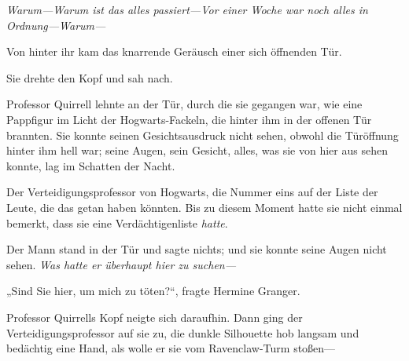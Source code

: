 


\emph{Warum—Warum ist das alles passiert—Vor einer Woche war noch alles in Ordnung—Warum—}

Von hinter ihr kam das knarrende Geräusch einer sich öffnenden Tür.

Sie drehte den Kopf und sah nach.

Professor Quirrell lehnte an der Tür, durch die sie gegangen war, wie eine Pappfigur im Licht der Hogwarts-Fackeln, die hinter ihm in der offenen Tür brannten. Sie konnte seinen Gesichtsausdruck nicht sehen, obwohl die Türöffnung hinter ihm hell war; seine Augen, sein Gesicht, alles, was sie von hier aus sehen konnte, lag im Schatten der Nacht.

Der Verteidigungsprofessor von Hogwarts, die Nummer eins auf der Liste der Leute, die das getan haben könnten. Bis zu diesem Moment hatte sie nicht einmal bemerkt, dass sie eine Verdächtigenliste \emph{hatte}.

Der Mann stand in der Tür und sagte nichts; und sie konnte seine Augen nicht sehen. \emph{Was hatte er überhaupt hier zu suchen—}

„Sind Sie hier, um mich zu töten?“, fragte Hermine Granger.

Professor Quirrells Kopf neigte sich daraufhin.
%
Dann ging der Verteidigungsprofessor auf sie zu, die dunkle Silhouette hob langsam und bedächtig eine Hand, als wolle er sie vom Ravenclaw-Turm stoßen—


